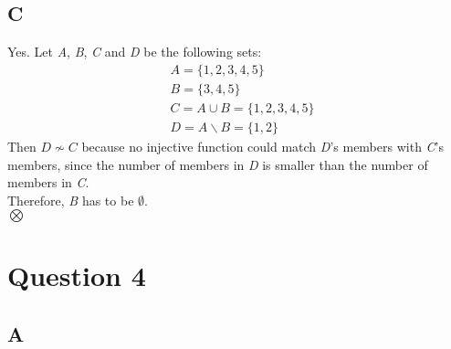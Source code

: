 \documentclass[12pt, oneside]{article}
\begin{document}
\subsection{C}
Yes. Let \emph{A}, \emph{B}, \emph{C} and \emph{D} be the following sets:
\begin{equation*}
\begin{split}
& A = \{1, 2, 3, 4, 5\}\\
& B = \{3, 4, 5\}\\
& C = A \cup B = \{1, 2, 3, 4, 5\}\\
& D = A \backslash B = \{1, 2\}
\end{split}
\end{equation*}
Then $D \nsim C$ because no injective function could match \emph{D}'s members with \emph{C}'s members, since the number of members in \emph{D} is smaller than the number of members in \emph{C}.\\
Therefore, \emph{B} has to be $\emptyset$.\\
$\bigotimes$

\section{Question 4}
\subsection{A}
\end{document}

